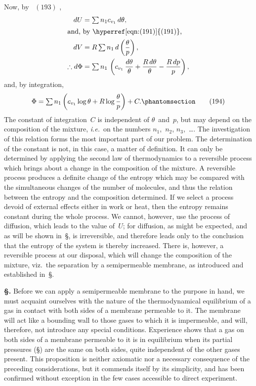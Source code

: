 \documentclass[12pt]{book}[2005/09/16]
\newcommand{\Section}[1]{
  \medskip\par\textbf{§\;#1}
  \label{section:#1}
}
\newcommand{\SecRef}[2][§\;]{\hyperref[section:#2.]{{\upshape #1#2}}}
\newcommand{\Tag}[1]{%
  \phantomsection\label{eqn:#1}\tag*{\ensuremath{#1}}%
}
\newcommand{\Eq}[1]{%
  \hyperref[eqn:#1]{\ensuremath{#1}}%
}
\newcommand{\PageSep}[1]{\ignorespaces}
\newcommand{\ie}{\emph{i.e.}}
\newcommand{\tsum}{\mathop{\textstyle\sum}\limits}
\begin{document}
Now, by~\Eq{(193)},
%
%
%
%
\begin{align*}
dU &= \tsum n_{1} c_{v_{1}}\, d\theta, \\
\intertext{and, by~\Eq{(191)},}
dV &= R \tsum n_{1}\, d\left(\frac{\theta}{p}\right), \\
\therefore
d\Phi &= \tsum n_{1}\, \left(c_{v_{1}}\, \frac{d\theta}{\theta} + \frac{R\, d\theta}{\theta} - \frac{R\, dp}{p}\right),
\end{align*}
and, by integration,
\[
\Phi = \tsum n_{1} \left(c_{v_{1}} \log \theta + R \log \frac{\theta}{p}\right) + C.
\Tag{(194)}
\]
The constant of integration~$C$ is independent of $\theta$~and~$p$,
but may depend on the composition of the mixture, \ie\ on
the numbers $n_{1}$,~$n_{2}$, $n_{3}$,~\dots. The investigation of this relation
forms the most important part of our problem. The determination
of the constant is not, in this case, a matter of
definition. It can only be determined by applying the
second law of thermodynamics to a reversible process which
brings about a change in the composition of the mixture.
A reversible process produces a definite change of the entropy
which may be compared with the simultaneous changes of
the number of molecules, and thus the relation between the
entropy and the composition determined. If we select a
process devoid of external effects either in work or heat,
then the entropy remains constant during the whole process.
We cannot, however, use the process of diffusion, which leads
to the value of~$U$; for diffusion, as might be expected, and
as will be shown in~\SecRef{238}, is irreversible, and therefore leads
only to the conclusion that the entropy of the system is
thereby increased. There is, however, a reversible process
at our disposal, which will change the composition of the
\PageSep{210}
mixture, viz.\ the separation by a semipermeable membrane,
as introduced and established in~\SecRef{229}.

\Section{235.} Before we can apply a semipermeable membrane
to the purpose in hand, we must acquaint ourselves with
the nature of the thermodynamical equilibrium of a gas in
contact with both sides of a membrane permeable to it.
The membrane will act like a bounding wall to those gases
to which it is impermeable, and will, therefore, not introduce
any special conditions. Experience shows that a gas on both
sides of a membrane permeable to it is in equilibrium when
its partial pressures (\SecRef{18}) are the same on both sides, quite
independent of the other gases present. This proposition
is neither axiomatic nor a necessary consequence of the
preceding considerations, but it commends itself by its
simplicity, and has been confirmed without exception in
the few cases accessible to direct experiment.
\end{document}
